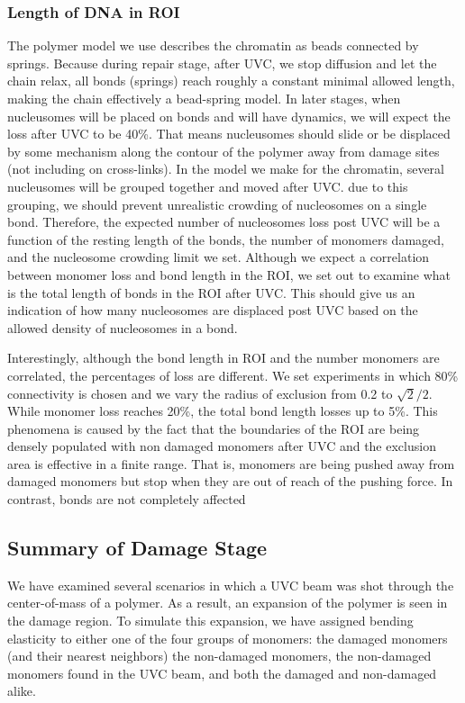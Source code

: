 \documentclass[12pt]{report}
\begin{document}
   \subsubsection{Length of DNA in ROI}
   The polymer model we use describes the chromatin as beads connected by springs. Because during repair stage, after UVC, we stop diffusion and let the chain relax, all bonds (springs) reach roughly a constant minimal allowed length, making the chain effectively a bead-spring model. In later stages, when nucleusomes will be placed on bonds and will have dynamics, we will expect the loss after UVC to be 40\%. That means nucleusomes should slide or be displaced by some mechanism along the contour of the polymer away from damage sites (not including on cross-links). In the model we make for the chromatin, several nucleusomes will be grouped together and moved after UVC. due to this grouping, we should prevent unrealistic crowding of nucleosomes on a single bond. Therefore, the expected number of nucleosomes loss post UVC will be a function of the resting length of the bonds, the number of monomers damaged, and the nucleosome crowding limit we set. Although we expect a correlation between monomer loss and bond length in the ROI, we set out to examine what is the total length of bonds in the ROI after UVC. 
   This should give us an indication of how many nucleosomes are displaced post UVC based on the allowed density of nucleosomes in a bond. 
   
   Interestingly, although the bond length in ROI and the number monomers are correlated, the percentages of loss are different. We set experiments in which 80\% connectivity is chosen and we vary the radius of exclusion from 0.2 to $\sqrt{2}/2$.  While monomer loss reaches 20\%, the total bond length losses up to 5\%. This phenomena is caused by the fact that the boundaries of the ROI are being densely populated with non damaged monomers after UVC and the exclusion area is effective in a finite range. That is, monomers are being pushed away from damaged monomers but stop when they are out of reach of the pushing force. In contrast, bonds are not completely affected
   
   

  \subsection{Summary of Damage Stage}
	 We have examined several scenarios in which a UVC beam was shot through the center-of-mass of a polymer. As a result, an expansion of the polymer is seen in the damage region. To simulate this expansion, we have assigned bending elasticity to either one of the four groups of monomers: the damaged monomers (and their nearest neighbors) the non-damaged monomers, the non-damaged monomers found in the UVC beam, and both the damaged and non-damaged alike. 
	 
\end{document}
